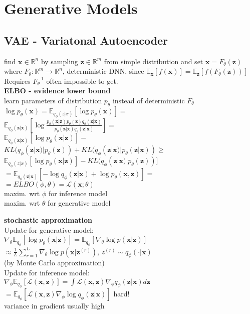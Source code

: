 \section*{Generative Models}
\subsection*{VAE - Variatonal Autoencoder}
find $\mathbf{x}\in\mathbb{R}^n$ by sampling $\mathbf{z}\in\mathbb{R}^m$ from simple distribution and set
$\mathbf{x}=F_\theta(\mathbf{z})$ where $F_\theta:\mathbb{R}^m\rightarrow \mathbb{R}^n$, deterministic DNN, since $\mathbb{E}_\mathbf{x}[f(\mathbf{x})]{=}\mathbb{E}_\mathbf{z}[f(F_\theta(\mathbf{z}))]$\\
Requires $F_\theta^{-1}$ often impossible to get.\\
\textbf{ELBO - evidence lower bound}\\
learn parameters of distribution $p_\theta$ instead of deterministic $F_\theta$\\
$\log p_\theta(\mathbf{x}){=}\mathbb{E}_{q_\phi(z|x)}[\log p_\theta(\mathbf{x})]{=}$\\
$\mathbb{E}_{q_\phi(\mathbf{z}|\mathbf{x})}[\log\frac{p_\theta(\mathbf{x}|\mathbf{z})p_\theta(\mathbf{z})q_\theta(\mathbf{z}|\mathbf{x})}{p_\theta(\mathbf{z}|\mathbf{x})q_\theta(\mathbf{z}|\mathbf{x})}]{=}$\\
$\mathbb{E}_{ q_\phi(\mathbf{z}|\mathbf{x})}[\log p_\theta(\mathbf{x}|\mathbf{z})]-$\\
$KL(q_\phi(\mathbf{z}|\mathbf{x})|p_\theta(\mathbf{z})){+}KL(q_\phi(\mathbf{z}|\mathbf{x})|p_\theta(\mathbf{z}|\mathbf{x})){\geq}$\\
$\mathbb{E}_{q_\phi(z|x)}[\log p_\theta(\mathbf{x}|\mathbf{z})]{-}KL(q_\phi(\mathbf{z}|\mathbf{x})|p_\theta(\mathbf{z}))]$\\
${=}\mathbb{E}_{q_\phi(\mathbf{z}|\mathbf{x})}[-\log q_\phi(\mathbf{z}|\mathbf{x}){+}\log p_\theta(\mathbf{x}, \mathbf{z})]{=}$\\
$=ELBO(\phi,\theta){=}\mathcal{L}(\mathbf{x};\theta)$\\
maxim. wrt $\phi$ for inference model\\
maxim. wrt $\theta$ for generative model

\textbf{stochastic approximation}\\
Update for generative model:\\
$\nabla_\theta\mathbb{E}_{q_\phi}[\log p_\theta(\mathbf{x}|\mathbf{z})]{=}\mathbb{E}_{q_\phi}[\nabla_\theta \log p(\mathbf{x}|\mathbf{z})]$\\
$\approx\frac{1}{L}\sum_{r=1}^L\nabla_\theta\log p(\mathbf{x}|\mathbf{z}^{(r)})$, $z^{(r)}\sim q_\phi(\cdot|\mathbf{x})$\\
(by Monte Carlo approximation)\\
Update for inference model:\\
$\nabla_\phi\mathbb{E}_{q_\phi}[\mathcal{L}(\mathbf{x},\mathbf{z})]{=}\int \mathcal{L}(\mathbf{x},\mathbf{z}) \nabla_\phi q_\phi(\mathbf{z}|\mathbf{x})d\mathbf{z}$ \\
$=\mathbb{E}_{q_\phi}[\mathcal{L}(\mathbf{x}, \mathbf{z})\nabla_\phi\log q_\phi(\mathbf{z}|\mathbf{x})]$ hard!\\
variance in gradient usually high

